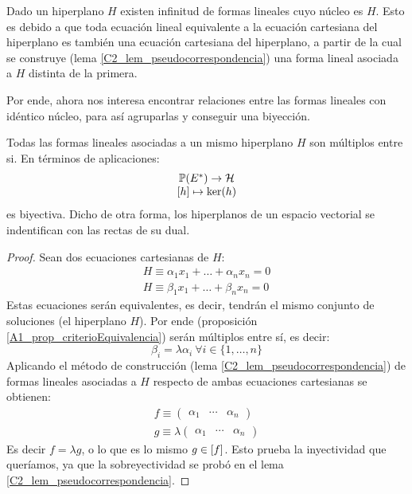 Dado un hiperplano $H$ existen infinitud de formas lineales cuyo núcleo es $H$. Esto es debido a que toda ecuación lineal equivalente a la ecuación cartesiana del hiperplano es también una ecuación cartesiana del hiperplano, a partir de la cual se construye (lema \ref{C2_lem_pseudocorrespondencia}) una forma lineal asociada a $H$ distinta de la primera.

Por ende, ahora nos interesa encontrar relaciones entre las formas lineales con idéntico núcleo, para así agruparlas y conseguir una biyección.

\begin{lem}
	\label{C2_lem_correspondencia}
	Todas las formas lineales asociadas a un mismo hiperplano $H$ son múltiplos entre si. En términos de aplicaciones:
	\[\begin{array}{c}
	\mathbb{P}(E^*)\to\mathcal{H}\\
	\left [ h \right ]\mapsto \ker(h)
	\end{array}
	\]
	es biyectiva. Dicho de otra forma, los hiperplanos de un espacio vectorial se indentifican con las rectas de su dual.
\end{lem}
\begin{proof}
	Sean dos ecuaciones cartesianas de $H$:
	\begin{gather}
		H\equiv \alpha_1x_1+\dots+\alpha_nx_n=0\\
		H\equiv \beta_1x_1+\dots+\beta_nx_n=0
	\end{gather}
	Estas ecuaciones serán equivalentes, es decir, tendrán el mismo conjunto de soluciones (el hiperplano $H$). Por ende (proposición \ref{A1_prop_criterioEquivalencia}) serán múltiplos entre sí, es decir:
	\begin{equation}
		\beta_i = \lambda\alpha_i\ \forall i\in\{1,\dots,n\}
	\end{equation}
	Aplicando el método de construcción (lema \ref{C2_lem_pseudocorrespondencia}) de formas lineales asociadas a $H$ respecto de ambas ecuaciones cartesianas se obtienen:
	\begin{gather}
		f\equiv\begin{pmatrix}
			\alpha_1 & \cdots & \alpha_n
		\end{pmatrix}\\
		g\equiv\lambda\begin{pmatrix}
			\alpha_1 & \cdots & \alpha_n
		\end{pmatrix}
	\end{gather}
	Es decir $f=\lambda g$, o lo que es lo mismo $g\in\left [ f \right ]$. Esto prueba la inyectividad que queríamos, ya que la sobreyectividad se probó en el lema \ref{C2_lem_pseudocorrespondencia}.
\end{proof}

